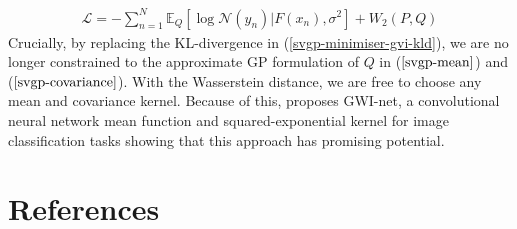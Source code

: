 \documentclass[twoside,11pt]{article}
\begin{document}
\begin{align}
    \label{gwi-objective}
    \mathcal{L} = -\sum_{n=1}^N \mathbb{E}_{Q}\left[\log \mathcal{N}(y_n) \vert F(x_n), \sigma^2\right] + W_2 (P, Q)
\end{align}
Crucially, by replacing the KL-divergence in (\ref{svgp-minimiser-gvi-kld}), we are no longer constrained to the approximate GP formulation of $Q$ in  ($\ref{svgp-mean}$) and ($\ref{svgp-covariance}$). With the Wasserstein distance, we are free to choose any mean and covariance kernel. Because of this, \cite{wild2022generalized} proposes GWI-net, a convolutional neural network mean function and squared-exponential kernel for image classification tasks showing that this approach has promising potential.
\begingroup
\let\clearpage\relax
\AtNextBibliography{\small}
\section*{References}
\printbibliography[heading=talikarng, title = {References}]
\endgroup
\end{document}
